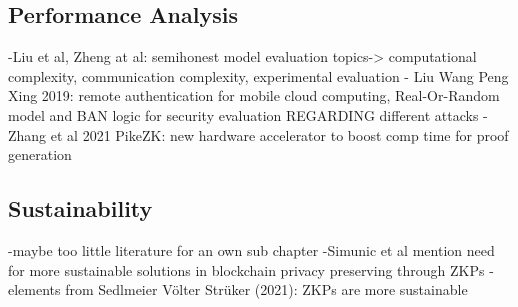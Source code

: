 \subsection{Performance Analysis}
-Liu et al, Zheng at al: semihonest model evaluation topics-> computational complexity, communication complexity, experimental evaluation
- Liu Wang Peng Xing 2019: remote authentication for mobile cloud computing, Real-Or-Random model and BAN logic for security evaluation REGARDING different attacks
- Zhang et al 2021 PikeZK: new hardware accelerator to boost comp time for proof generation

\subsection{Sustainability}
-maybe too little literature for an own sub chapter
-Simunic et al mention need for more sustainable solutions in blockchain privacy preserving through ZKPs
-elements from Sedlmeier Völter Strüker (2021): ZKPs are more sustainable 